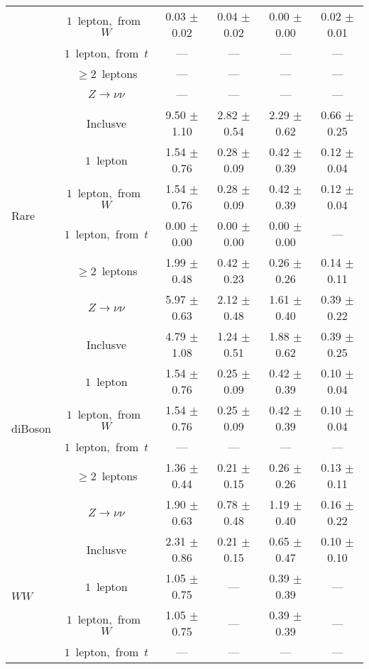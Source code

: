 \documentclass{article}
\begin{document}
\begin{longtable}{|l|c|c|c|c|c|}
 & $1$~lepton,~from~$W$  & 0.03 $\pm$ 0.02  & 0.04 $\pm$ 0.02  & 0.00 $\pm$ 0.00  & 0.02 $\pm$ 0.01 \\* 
 & $1$~lepton,~from~$t$  & ---  & ---  & ---  & --- \\* 
 & $\ge2$~leptons  & ---  & ---  & ---  & --- \\* 
 & $Z\rightarrow\nu\nu$  & ---  & ---  & ---  & --- \\* 
\hline 
\multirow{6}{*}{Rare} & Inclusve  & 9.50 $\pm$ 1.10  & 2.82 $\pm$ 0.54  & 2.29 $\pm$ 0.62  & 0.66 $\pm$ 0.25 \\* 
 & $1$~lepton  & 1.54 $\pm$ 0.76  & 0.28 $\pm$ 0.09  & 0.42 $\pm$ 0.39  & 0.12 $\pm$ 0.04 \\* 
 & $1$~lepton,~from~$W$  & 1.54 $\pm$ 0.76  & 0.28 $\pm$ 0.09  & 0.42 $\pm$ 0.39  & 0.12 $\pm$ 0.04 \\* 
 & $1$~lepton,~from~$t$  & 0.00 $\pm$ 0.00  & 0.00 $\pm$ 0.00  & 0.00 $\pm$ 0.00  & --- \\* 
 & $\ge2$~leptons  & 1.99 $\pm$ 0.48  & 0.42 $\pm$ 0.23  & 0.26 $\pm$ 0.26  & 0.14 $\pm$ 0.11 \\* 
 & $Z\rightarrow\nu\nu$  & 5.97 $\pm$ 0.63  & 2.12 $\pm$ 0.48  & 1.61 $\pm$ 0.40  & 0.39 $\pm$ 0.22 \\* 
\hline 
\multirow{6}{*}{diBoson} & Inclusve  & 4.79 $\pm$ 1.08  & 1.24 $\pm$ 0.51  & 1.88 $\pm$ 0.62  & 0.39 $\pm$ 0.25 \\* 
 & $1$~lepton  & 1.54 $\pm$ 0.76  & 0.25 $\pm$ 0.09  & 0.42 $\pm$ 0.39  & 0.10 $\pm$ 0.04 \\* 
 & $1$~lepton,~from~$W$  & 1.54 $\pm$ 0.76  & 0.25 $\pm$ 0.09  & 0.42 $\pm$ 0.39  & 0.10 $\pm$ 0.04 \\* 
 & $1$~lepton,~from~$t$  & ---  & ---  & ---  & --- \\* 
 & $\ge2$~leptons  & 1.36 $\pm$ 0.44  & 0.21 $\pm$ 0.15  & 0.26 $\pm$ 0.26  & 0.13 $\pm$ 0.11 \\* 
 & $Z\rightarrow\nu\nu$  & 1.90 $\pm$ 0.63  & 0.78 $\pm$ 0.48  & 1.19 $\pm$ 0.40  & 0.16 $\pm$ 0.22 \\* 
\hline 
\multirow{6}{*}{$WW$} & Inclusve  & 2.31 $\pm$ 0.86  & 0.21 $\pm$ 0.15  & 0.65 $\pm$ 0.47  & 0.10 $\pm$ 0.10 \\* 
 & $1$~lepton  & 1.05 $\pm$ 0.75  & ---  & 0.39 $\pm$ 0.39  & --- \\* 
 & $1$~lepton,~from~$W$  & 1.05 $\pm$ 0.75  & ---  & 0.39 $\pm$ 0.39  & --- \\* 
 & $1$~lepton,~from~$t$  & ---  & ---  & ---  & --- \\* 

\end{longtable}
\end{document}
